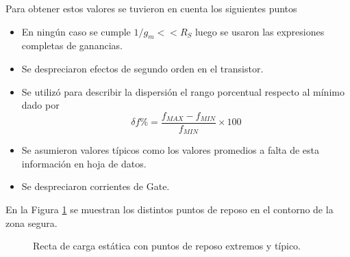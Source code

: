 \documentclass[a4paper, 10pt, spanish]{article}
\begin{document}
Para obtener estos valores se tuvieron en cuenta los siguientes puntos

\begin{itemize}
	\item En ningún caso se cumple $1/g_m << R_S$ luego se usaron las expresiones completas de ganancias.
	\item Se despreciaron efectos de segundo orden en el transistor.
	\item Se utilizó para describir la dispersión el rango porcentual respecto al mínimo dado por
		\begin{equation}
		\delta f \% = \frac{f_{MAX}-f_{MIN}}{f_{MIN}}\times 100 \nonumber
		\end{equation}
	\item Se asumieron valores típicos como los valores promedios a falta de esta información en hoja de datos.
	\item Se despreciaron corrientes de Gate.
	\end{itemize}


En la Figura \ref{fig:dispersion} se muestran los distintos puntos de reposo en el contorno de la zona segura.


\begin{figure}[h]
    \begin{center}

    \end{center}
    \caption{Recta de carga estática con puntos de reposo extremos y típico.}
    \label{fig:dispersion}
    \end{figure}
\end{document}
